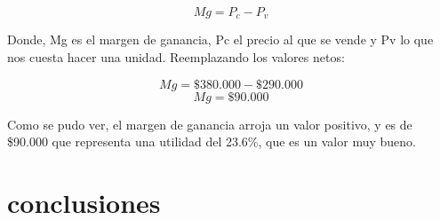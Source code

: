 \documentclass{report}
\begin{document}
    \[Mg = P_{c} - P_{v}\]
    
    Donde, Mg es el margen de ganancia, Pc el precio al que se vende y Pv lo que nos cuesta hacer una unidad. Reemplazando los valores netos:
    
    \[Mg = \$ 380.000 - \$ 290.000\]
    \[Mg = \$ 90.000\]
    
    Como se pudo ver, el margen de ganancia arroja un valor positivo, y es de \$90.000 que representa una utilidad del 23.6\%, que es un valor muy bueno.
 
    \section{conclusiones}
    
\end{document}

